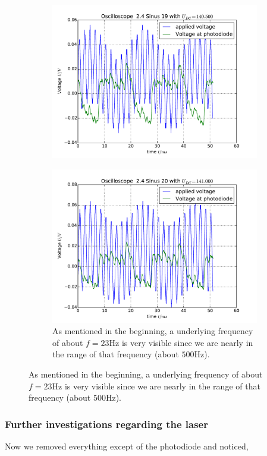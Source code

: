 \begin{figure}
\begin{subfigure}[b]{\picwidth}
        \includegraphics[width=\textwidth]{analysis/figures/24sinus19}
        \caption{}
    \end{subfigure}
    \begin{subfigure}[b]{\picwidth}
        \includegraphics[width=\textwidth]{analysis/figures/24sinus20}
        \caption{As mentioned in the beginning, a underlying
            frequency of about $f=23$Hz is very visible since 
            we are nearly in the range of that frequency (about
                $500$Hz).}
    \end{subfigure}
\label{fig:sinus10}
\end{figure}
\subsubsection{Further investigations regarding the laser}
Now we removed everything except of the photodiode and noticed, 
\clearpage
